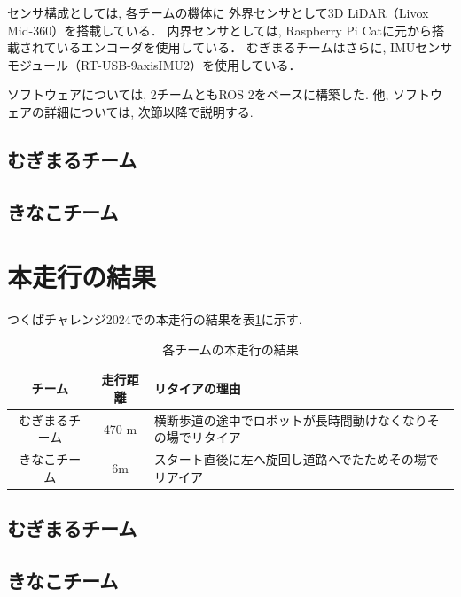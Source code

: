 \documentclass[twocolumn,9pt]{jsproceedings}
\begin{document}
センサ構成としては, 各チームの機体に
外界センサとして3D LiDAR（Livox Mid-360）を搭載している．
内界センサとしては, 
Raspberry Pi Catに元から搭載されているエンコーダを使用している．
むぎまるチームはさらに, IMUセンサモジュール（RT-USB-9axisIMU2\cite{RTshopIMU}）を使用している．

ソフトウェアについては, 
2チームともROS 2\cite{ROS 2}をベースに構築した. 
他, ソフトウェアの詳細については, 
次節以降で説明する. 


\subsection{むぎまるチーム}



\subsection{きなこチーム}\label{sub:localization}



\section{本走行の結果}

つくばチャレンジ2024での本走行の結果を表\ref{MainRun}に示す. 

\begin{table}[H]
  \caption{各チームの本走行の結果}
  \label{MainRun}
  \begin{tabular}{|c|c|p{4.0cm}|}
    \hline
    チーム         & 走行距離 & リタイアの理由\\
    \hline
    むぎまるチーム & 470 m    & 横断歩道の途中でロボットが長時間動けなくなりその場でリタイア\\
    \hline
    きなこチーム　 & 6m    & スタート直後に左へ旋回し道路へでたためその場でリアイア \\
    \hline
  \end{tabular}
\end{table}

\subsection{むぎまるチーム}


\subsection{きなこチーム}

\end{document}
